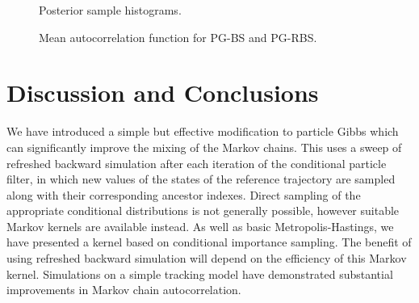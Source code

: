 \documentclass{article}
\begin{document}
\begin{figure}
\centering
\subfloat[PG-BS (N=100)]{  }
\subfloat[PG-BS (N=200)]{  }
\subfloat[PG-RBS (N=100)]{  }
\caption{Posterior sample histograms.}
\label{fig:sample_hist}
\end{figure}

\begin{figure}
\centering

\caption{Mean autocorrelation function for PG-BS and PG-RBS.}
\label{fig:acf}
\end{figure}


\section{Discussion and Conclusions}

We have introduced a simple but effective modification to particle Gibbs which can significantly improve the mixing of the Markov chains. This uses a sweep of refreshed backward simulation after each iteration of the conditional particle filter, in which new values of the states of the reference trajectory are sampled along with their corresponding ancestor indexes. Direct sampling of the appropriate conditional distributions is not generally possible, however suitable Markov kernels are available instead. As well as basic Metropolis-Hastings, we have presented a kernel based on conditional importance sampling. The benefit of using refreshed backward simulation will depend on the efficiency of this Markov kernel. Simulations on a simple tracking model have demonstrated substantial improvements in Markov chain autocorrelation. 



\vfill
\pagebreak



\end{document}
